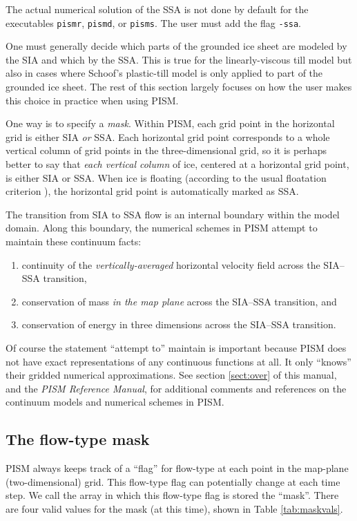 \documentclass[11pt,final]{amsart}
\begin{document}
The actual numerical solution of the SSA is not done by default for the executables \verb|pismr|, \verb|pismd|, or \verb|pisms|.  The user must add the flag \verb|-ssa|.

One must generally decide which parts of the grounded ice sheet are modeled by the SIA and which by the SSA.  This is true for the linearly-viscous till model \cite{MacAyeal} but also in cases where Schoof's plastic-till model is only applied to part of the grounded ice sheet.  The rest of this section largely focuses on how the user makes this choice in practice when using PISM.

One way is to specify a \emph{mask}.  Within PISM, each grid point in the horizontal grid is either SIA \emph{or} SSA.  Each horizontal grid point corresponds to a whole vertical column of grid points in the three-dimensional grid, so it is perhaps better to say that \emph{each vertical column} of ice, centered at a horizontal grid point, is either SIA or SSA.  When ice is floating (according to the usual floatation criterion \cite{WeisGreveHutter}), the horizontal grid point is automatically marked as SSA.

The transition from SIA to SSA flow is an internal boundary within the model domain.  Along this boundary, the numerical schemes in PISM attempt to maintain these continuum facts:
\renewcommand{\labelenumi}{\textbf{\roman{enumi})}~}
\begin{enumerate}
\item continuity of the \emph{vertically-averaged} horizontal velocity field across the SIA--SSA transition,
\item conservation of mass \emph{in the map plane} across the SIA--SSA transition, and
\item conservation of energy in three dimensions across the SIA--SSA transition.
\end{enumerate}
Of course the statement ``attempt to'' maintain is important because PISM does not have exact representations of any continuous functions at all.  It only ``knows'' their gridded numerical approximations.  See section \ref{sect:over} of this manual, and the \emph{PISM Reference Manual}, for additional comments and references on the continuum models and numerical schemes in PISM.

\subsection{The flow-type mask} \label{subsect:mask}  PISM always keeps track of a ``flag'' for flow-type at each point in the map-plane (two-dimensional) grid.  This flow-type flag can potentially change at each time step.  We call the array in which this flow-type flag is stored the ``mask''.  There are four valid values for the mask (at this time), shown in Table \ref{tab:maskvals}.
\end{document}
